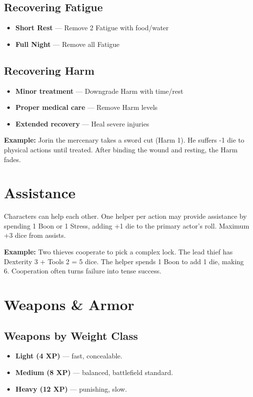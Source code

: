 \documentclass[11pt,twoside,openany]{book}
\begin{document}
\subsection*{Recovering Fatigue}
\begin{itemize}
\item \textbf{Short Rest} --- Remove 2 Fatigue with food/water
\item \textbf{Full Night} --- Remove all Fatigue
\end{itemize}

\subsection*{Recovering Harm}
\begin{itemize}
\item \textbf{Minor treatment} --- Downgrade Harm with time/rest
\item \textbf{Proper medical care} --- Remove Harm levels
\item \textbf{Extended recovery} --- Heal severe injuries
\end{itemize}

\textbf{Example:} Jorin the mercenary takes a sword cut (Harm 1). He suffers -1 die to physical actions until treated. After binding the wound and resting, the Harm fades.

\section*{Assistance} 

Characters can help each other. One helper per action may provide assistance by spending 1 Boon or 1 Stress, adding +1 die to the primary actor's roll. Maximum +3 dice from assists.

\textbf{Example:} Two thieves cooperate to pick a complex lock. The lead thief has Dexterity 3 + Tools 2 = 5 dice. The helper spends 1 Boon to add 1 die, making 6. Cooperation often turns failure into tense success.

\section*{Weapons \& Armor} 

\subsection*{Weapons by Weight Class}

\begin{itemize}
\item \textbf{Light (4 XP)} --- fast, concealable.
\item \textbf{Medium (8 XP)} --- balanced, battlefield standard.
\item \textbf{Heavy (12 XP)} --- punishing, slow.
\end{itemize}
\end{document}
